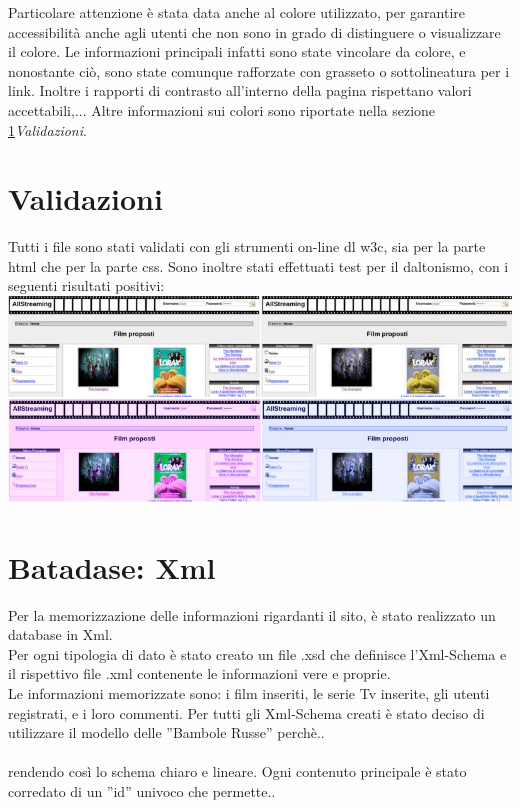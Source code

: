 Particolare attenzione è stata data anche al colore utilizzato, per garantire accessibilità anche agli utenti che non sono in grado di distinguere o visualizzare il colore. Le informazioni principali infatti sono state vincolare da colore, e nonostante ciò, sono state comunque rafforzate con grasseto o sottolineatura per i link.
Inoltre i rapporti di contrasto all'interno della pagina rispettano valori accettabili,... 
Altre informazioni sui colori sono riportate nella sezione \ref{validazioni}\textit{Validazioni}.



\section{Validazioni}
\label{validazioni}
Tutti i file sono stati validati con gli strumenti on-line dl w3c, sia per la parte html che per la parte css.
Sono inoltre stati effettuati test per il daltonismo, con i seguenti risultati positivi: 
\includegraphics[scale=0.55]{images/test}





\section{Batadase: Xml}
Per la memorizzazione delle informazioni rigardanti il sito, è stato realizzato un database in Xml.\\
Per ogni tipologia di dato è stato creato un file .xsd che definisce l'Xml-Schema e il rispettivo file .xml contenente le informazioni vere e proprie.\\
Le informazioni memorizzate sono: i film inseriti, le serie Tv inserite, gli utenti registrati, e i loro commenti.
Per tutti gli Xml-Schema creati è stato deciso di utilizzare il modello delle ''Bambole Russe'' perchè.. \\
\\
rendendo così lo schema chiaro e lineare.
Ogni contenuto principale è stato corredato di un ''id'' univoco che permette.. 










